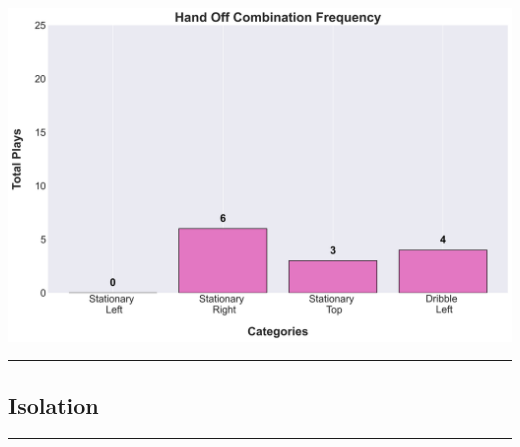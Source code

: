 \documentclass[a4paper,12pt]{article}
\begin{document}
\begin{table}[H]
{\begin{minipage}[t]{0.6\textwidth}
{\begin{tabular}
            \bottomrule
        \end{tabular}
        } %
    \end{minipage}
    } %
    \hfill %
    \begin{minipage}[c]{0.35\textwidth} %
        \flushright
        \includegraphics[width=\textwidth, height=.14\textheight]{images/HandOff_Combination_Freq.png} %
    \end{minipage}
\end{table}

\vspace{-1em} %
\hrule height 1pt width 1\textwidth %
\vspace{1em} %



\subsection{Isolation}

\vspace{1em} %
\hrule height 1pt width 1\textwidth %
\vspace{1em} %
\end{document}
